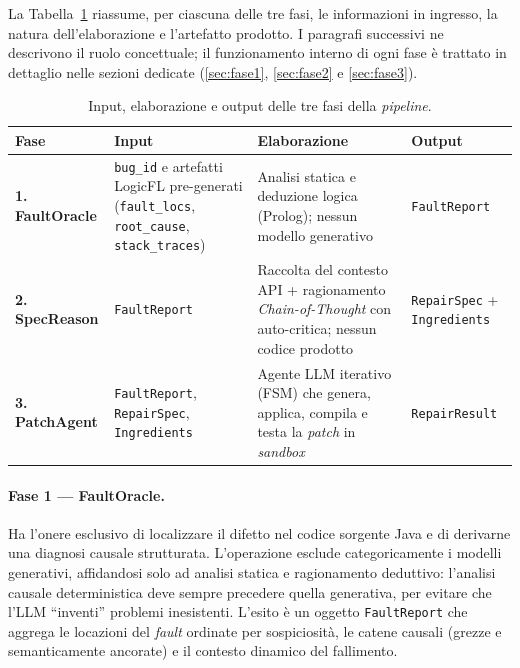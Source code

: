La Tabella~\ref{tab:pipeline_io} riassume, per ciascuna delle tre fasi, le informazioni in ingresso, la
natura dell'elaborazione e l'artefatto prodotto. I paragrafi successivi ne descrivono il ruolo
concettuale; il funzionamento interno di ogni fase è trattato in dettaglio nelle sezioni dedicate
(\ref{sec:fase1}, \ref{sec:fase2} e \ref{sec:fase3}).

\begin{table}[H]
\centering
\small
\caption{Input, elaborazione e output delle tre fasi della \textit{pipeline}.}
\label{tab:pipeline_io}
\begin{tabularx}{\textwidth}{@{}l >{\raggedright\arraybackslash}X >{\raggedright\arraybackslash}X l@{}}
\toprule
\textbf{Fase} & \textbf{Input} & \textbf{Elaborazione} & \textbf{Output} \\
\midrule
\textbf{1. FaultOracle} & \texttt{bug\_id} e artefatti LogicFL pre-generati (\texttt{fault\_locs}, \texttt{root\_cause}, \texttt{stack\_traces}) & Analisi statica e deduzione logica (Prolog); nessun modello generativo & \texttt{FaultReport} \\
\addlinespace
\textbf{2. SpecReason} & \texttt{FaultReport} & Raccolta del contesto API + ragionamento \textit{Chain-of-Thought} con auto-critica; nessun codice prodotto & \texttt{RepairSpec} + \texttt{Ingredients} \\
\addlinespace
\textbf{3. PatchAgent} & \texttt{FaultReport}, \texttt{RepairSpec}, \texttt{Ingredients} & Agente LLM iterativo (FSM) che genera, applica, compila e testa la \textit{patch} in \textit{sandbox} & \texttt{RepairResult} \\
\bottomrule
\end{tabularx}
\end{table}

\paragraph{Fase 1 --- FaultOracle.} Ha l'onere esclusivo di localizzare il difetto nel codice sorgente
Java e di derivarne una diagnosi causale strutturata. L'operazione esclude categoricamente i modelli
generativi, affidandosi solo ad analisi statica e ragionamento deduttivo: l'analisi causale
deterministica deve sempre precedere quella generativa, per evitare che l'LLM ``inventi'' problemi
inesistenti. L'esito è un oggetto \texttt{FaultReport} che aggrega le locazioni del \textit{fault}
ordinate per sospiciosità, le catene causali (grezze e semanticamente ancorate) e il contesto dinamico
del fallimento.

